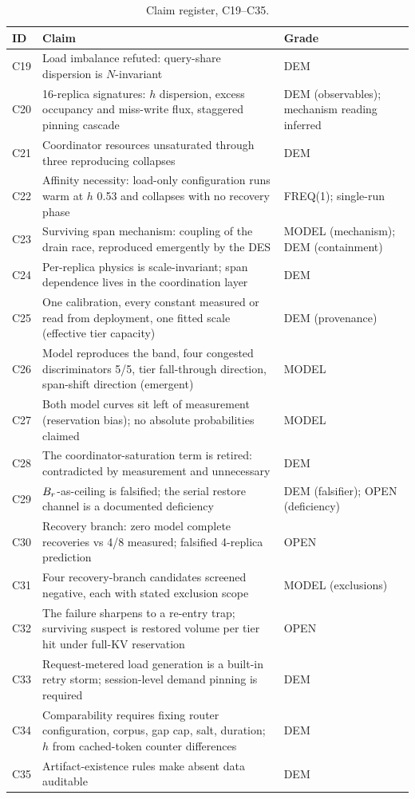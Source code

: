 \begin{table}[t]
\centering
\small
\begin{tabularx}{\textwidth}{@{}lXl@{}}
\toprule
ID & Claim & Grade \\
\midrule
C19 & Load imbalance refuted: query-share dispersion is $N$-invariant & DEM \\
C20 & 16-replica signatures: $h$ dispersion, excess occupancy and miss-write flux, staggered pinning cascade & DEM (observables); mechanism reading inferred \\
C21 & Coordinator resources unsaturated through three reproducing collapses & DEM \\
C22 & Affinity necessity: load-only configuration runs warm at $h$ 0.53 and collapses with no recovery phase & FREQ(1); single-run \\
C23 & Surviving span mechanism: coupling of the drain race, reproduced emergently by the DES & MODEL (mechanism); DEM (containment) \\
C24 & Per-replica physics is scale-invariant; span dependence lives in the coordination layer & DEM \\
C25 & One calibration, every constant measured or read from deployment, one fitted scale (effective tier capacity) & DEM (provenance) \\
C26 & Model reproduces the band, four congested discriminators 5/5, tier fall-through direction, span-shift direction (emergent) & MODEL \\
C27 & Both model curves sit left of measurement (reservation bias); no absolute probabilities claimed & MODEL \\
C28 & The coordinator-saturation term is retired: contradicted by measurement and unnecessary & DEM \\
C29 & $B_r$-as-ceiling is falsified; the serial restore channel is a documented deficiency & DEM (falsifier); OPEN (deficiency) \\
C30 & Recovery branch: zero model complete recoveries vs 4/8 measured; falsified 4-replica prediction & OPEN \\
C31 & Four recovery-branch candidates screened negative, each with stated exclusion scope & MODEL (exclusions) \\
C32 & The failure sharpens to a re-entry trap; surviving suspect is restored volume per tier hit under full-KV reservation & OPEN \\
C33 & Request-metered load generation is a built-in retry storm; session-level demand pinning is required & DEM \\
C34 & Comparability requires fixing router configuration, corpus, gap cap, salt, duration; $h$ from cached-token counter differences & DEM \\
C35 & Artifact-existence rules make absent data auditable & DEM \\
\bottomrule
\end{tabularx}
\caption{Claim register, C19--C35.}
\label{tab:claims-b}
\end{table}
